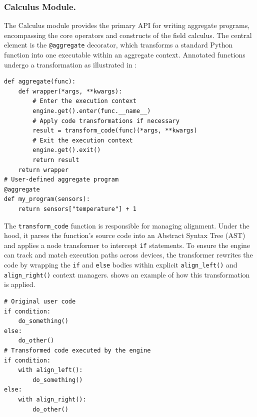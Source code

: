 \documentclass[runningheads]{llncs}
\begin{document}
\subsubsection{Calculus Module.}
The Calculus module provides the primary API for writing aggregate programs,
encompassing the core operators and constructs of the field calculus.
%
The central element is the \texttt{@aggregate} decorator,
which transforms a standard Python function into one executable within an aggregate context.
Annotated functions undergo a transformation as illustrated in :
\begin{lstlisting}[style=pythonstyle, caption={Transformation of an \texttt{@aggregate} function.}, label={lst:aggregate-transform}]
def aggregate(func):
    def wrapper(*args, **kwargs):
        # Enter the execution context
        engine.get().enter(func.__name__)
        # Apply code transformations if necessary
        result = transform_code(func)(*args, **kwargs)
        # Exit the execution context
        engine.get().exit()
        return result
    return wrapper
# User-defined aggregate program
@aggregate
def my_program(sensors):
    return sensors["temperature"] + 1
\end{lstlisting}
%
The \texttt{transform\_code} function is responsible for managing alignment. 
Under the hood, 
it parses the function's source code into an Abstract Syntax Tree (AST) 
and applies a node transformer to intercept \texttt{if} statements. 
To ensure the engine can track and match execution paths across devices, 
the transformer rewrites the code by wrapping the \texttt{if} and \texttt{else} bodies within explicit \texttt{align\_left()} and \texttt{align\_right()} context managers. 
 shows an example of how this transformation is applied.
\begin{lstlisting}[style=pythonstyle, caption={Example of code transformation for conditionals.}, label={lst:ast-transform}]
# Original user code
if condition:
    do_something()
else:
    do_other()
# Transformed code executed by the engine
if condition:
    with align_left():
        do_something()
else:
    with align_right():
        do_other()
\end{lstlisting}
\end{document}
